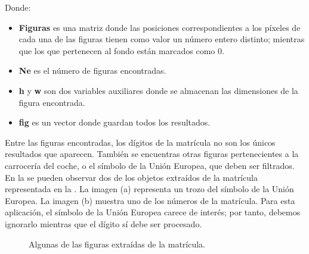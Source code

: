 Donde:\begin{itemize}
\item \textbf{Figuras} es una matriz donde las posiciones correspondientes a los píxeles de cada una de las figuras tienen como valor un número entero distinto; mientras que los que pertenecen al fondo están marcados como 0.

\item \textbf{Ne} es el número de figuras encontradas.

\item\textbf{h} y \textbf{w} son dos variables auxiliares donde se almacenan las dimensiones de la figura encontrada.

\item\textbf{fig} es un vector donde guardan todos los resultados.
\end{itemize}

Entre las figuras encontradas, los dígitos de la matrícula no son los únicos resultados que aparecen. También se encuentras otras figuras pertenecientes a la carrocería del coche, o el símbolo de la Unión Europea, que deben ser filtrados.\\

En la  se pueden observar dos de los objetos extraídos de la matrícula representada en la . La imagen (a) representa un trozo del símbolo de la Unión Europea. La imagen (b) muestra uno de los números de la matrícula. Para esta aplicación, el símbolo de la Unión Europea carece de interés; por tanto, debemos ignorarlo mientras que el dígito sí debe ser procesado.

\begin{figure}[!h]
\centering {}
\caption{\small{Algunas de las figuras extraídas de la matrícula.}} \label{Figuras}
\end{figure}

